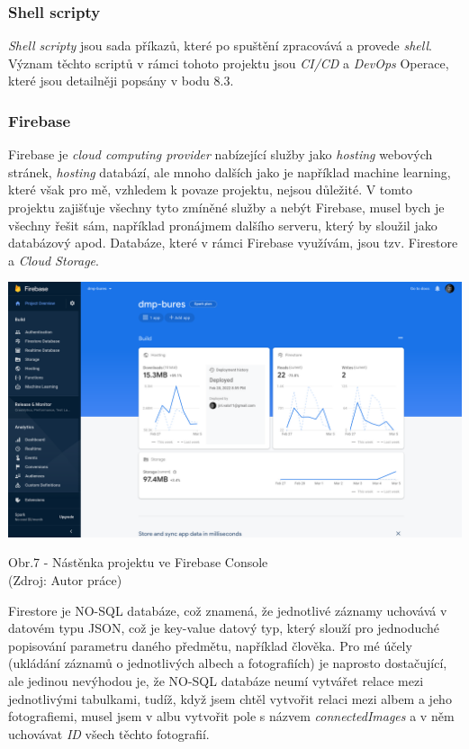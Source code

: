 \documentclass[12pt,a4paper]{report}
\begin{document}
  \subsubsection{Shell scripty}
  \emph{Shell} \emph{scripty} jsou sada příkazů, které po spuštění zpracovává a provede \emph{shell}. Význam těchto
  scriptů v rámci tohoto projektu jsou \emph{CI/CD} a \emph{DevOps} Operace, které jsou detailněji popsány v bodu 8.3.
  \subsubsection{Firebase}
  Firebase je \emph{cloud computing provider} nabízející služby jako \emph{hosting} webových stránek, \emph{hosting}
  databází, ale mnoho dalších jako je například machine learning, které však pro mě, vzhledem k
  povaze projektu, nejsou důležité. V tomto projektu zajišťuje všechny tyto zmíněné služby a nebýt
  Firebase, musel bych je všechny řešit sám, například pronájmem dalšího serveru, který by sloužil jako databázový apod.
  Databáze, které v rámci Firebase využívám, jsou tzv. Firestore a \emph{Cloud Storage}.

  \vspace*{0.5cm}
  \noindent\includegraphics[width=\linewidth]{firebaseDash.png}
  \begin{center}
    Obr.7 -  Nástěnka projektu ve Firebase Console \\
    (Zdroj: Autor práce)
  \end{center}
  \vspace*{0.5cm}
  Firestore je NO-SQL databáze, což znamená, že jednotlivé záznamy uchovává v datovém typu
  JSON, což je key-value datový typ, který slouží pro jednoduché popisování parametru daného
  předmětu, například člověka. Pro mé účely (ukládání záznamů o jednotlivých albech a fotografiích)
  je naprosto dostačující, ale jedinou nevýhodou je, že NO-SQL databáze neumí vytvářet relace
  mezi jednotlivými tabulkami, tudíž, když jsem chtěl vytvořit relaci mezi albem a jeho fotografiemi,
  musel jsem v albu vytvořit pole s názvem \emph{connectedImages} a v něm uchovávat \emph{ID} všech těchto
  fotografií.
\end{document}
